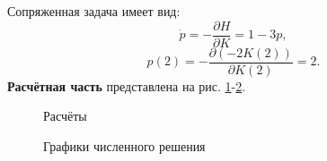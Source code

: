 \documentclass[a4paper, 12pt]{article}
\newcommand{\df}[2]{\frac{\partial #1}{\partial #2}}
\begin{document}
Сопряженная задача имеет вид:
\begin{equation}
    \dot p = -\df{H}{K}=1-3p,
\end{equation}
\begin{equation}
    p(2)=-\df{(-2K(2))}{K(2)}=2.
\end{equation}
{\bf Расчётная часть} представлена на рис. \ref{11beg}-\ref{11end}.
\begin{figure}[h]
    \noindent{}
    \caption{Расчёты}
    \label{11beg}
\end{figure}
\begin{figure}[h]
    \noindent{}
    \caption{Графики численного решения}
    \label{11end}
\end{figure} 
\end{document}
